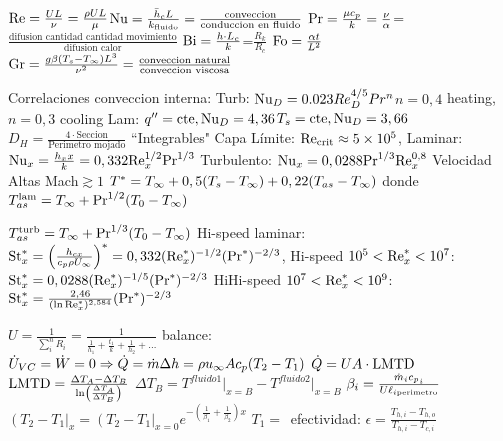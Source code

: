 \formuleoseparator


\formuleoseparator
\begin{formuleo}[Adimensionales]
 $\mathrm{Re}=\frac{UL}{\nu}=\frac{\rho UL}{\mu}$\separar    $\mathrm{Nu}=\frac{\Bar{h}_c L}{k_{\mathrm{fluido}}}=\frac{\text{conveccion}}{\text{conduccion en fluido}}$ \newline
 $\mathrm{Pr}=\frac{\mu {c_p}}{k}=\frac{\nu}{\alpha}$=$\frac{\text{difusion\ cantidad\ cantidad\ movimiento}}{\text
 {difusion\ calor}}$ \separar $\mathrm{Bi}=\frac{h\cdot L_c}{k}$=$\frac{R_k}{R_c}$ \separar $\mathrm{Fo}=\frac{\alpha t}{L^2}$ \separar $\mathrm{Gr}=\frac{g \beta (T_s-T_\infty)L^3}{\nu ^2}=\frac{\text{conveccion natural}}{\text{conveccion viscosa}}$ 
\end{formuleo}
\formuleoseparator
\clearpage
\begin{formuleo}
 Correlaciones conveccion interna: Turb: $\mathrm{Nu}_{D}=0.023 R e_{D}^{4 / 5} P r^{n}$\going $n=0,4$ heating, $n=0,3$ cooling \separar Lam: $q''=\textrm{cte}, \mathrm{Nu}_D=4,36$\going$T_s=\textrm{cte}, \mathrm{Nu}_D = 3,66$ \separar $D_{H}=\frac{4\cdot \text{Seccion}}{\text{Perimetro mojado}}$\newline 
 ``Integrables"{} Capa Límite: $\mathrm{Re}_{\mathrm{crit}}\approx5\times10^{5}$, Laminar:$\mathrm{Nu}_x=\frac{h_x x}{k}=0,332 \mathrm{Re}_x^{1/2}\mathrm{Pr}^{1/3}$ \separar Turbulento: $\mathrm{Nu}_x = 0,0288\mathrm{Pr}^{1/3} \mathrm{Re}_x^{0,8}$  \separar Velocidad Altas Mach$\gtrsim1$ $T^{*} = T_\infty +0,5(T_s-T_\infty)+0,22(T_{as}-T_{\infty})$ donde $T_{as}^{\mathrm{lam}}=T_\infty+\mathrm{Pr}^{1/2}(T_0-T_\infty)$
 
 $T_{as}^{\mathrm{turb}}=T_\infty+\mathrm{Pr}^{1/3}(T_0-T_\infty)$ Hi-speed laminar: $\mathrm{St}_x^{*}=\left( \frac{h_{cx}}{{c_p} \rho U_\infty}\right)^{*}=0,332(\mathrm{Re}_x^{*})^{-1/2} (\mathrm{Pr}^{*})^{-2/3}$, Hi-speed $10^5<\mathrm{Re}_x^{*}<10^7$: $\mathrm{St}_x^{*}=0,0288(\mathrm{Re}_x^{*})^{-1/5} (\mathrm{Pr}^{*})^{-2/3}$ \separar HiHi-speed $10^7<\mathrm{Re}_x^{*}<10^9$: $\mathrm{St}_x^{*}=\frac{2,46}{(\ln\mathrm{Re}_x^{*})^{2,584}} (\mathrm{Pr}^{*})^{-2/3}$
\end{formuleo}
\formuleoseparator
\begin{formuleo}[Intercambiadores]
 $U=\frac{1}{\sum_i^n R_i}=\frac{1}{\frac{1}{h_1}+\frac{t_1}{k}+\frac{1}{h_2}+\ldots }$ \separar balance: $\dot{U}_{VC}=\dot{W} =0 \Rightarrow \dot{Q} = \dot{m} \Delta h = \rho u_{\infty} A {c_p}  (T_2-T_1)$ 
\newline
\separar $\dot{Q} = U A \cdot \operatorname{LMTD} $ \separar $\operatorname{LMTD}=\frac{\Delta T_{A}-\Delta T_{B}}{\ln \left(\frac{\Delta T_{A}}{\Delta T_{B}}\right)}$ \separar $\Delta T_{B} = T^{fluido 1}\big|_{x=B}-T^{fluido 2}\big|_{x=B}$ \separar $\beta_{i} = \frac{\dot{m}_{i} {{c_p}}_{i}}{U \ell_{i\mathrm{perimetro}} }$  \newline $ \left( T_2-T_1 \right|_x  = \left( T_2-T_1 \right|_{x=0} e^{-\left(\frac{1}{\beta_1}+\frac{1}{\beta_2}\right)x}$ \separar $T_{1}=\frac{}{}$ efectividad: $\epsilon=\frac{T_{h,i}-T_{h,o}}{T_{h,i}-T_{c,i}}$ 
\end{formuleo}

